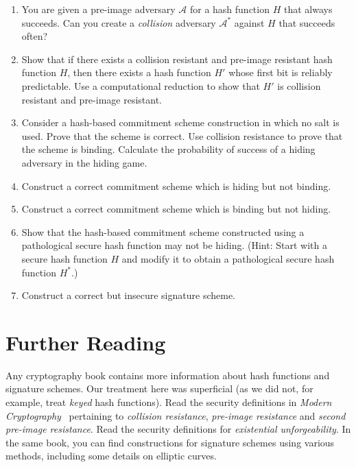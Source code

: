 \begin{enumerate}
  \item You are given a pre-image adversary $\mathcal{A}$ for a hash function $H$ that always
        succeeds. Can you create a \emph{collision} adversary $\mathcal{A}^*$ against $H$
        that succeeds often?
  \item Show that if there exists a collision resistant and pre-image resistant hash function $H$,
        then there exists a hash function $H'$ whose first bit is reliably predictable.
        Use a computational reduction to show that $H'$ is collision resistant and pre-image
        resistant.
  \item Consider a hash-based commitment scheme construction in which no salt is used.
        Prove that the scheme is correct. Use collision resistance to prove that the scheme is binding.
        Calculate the probability of success of a hiding adversary in the
        hiding game.\label{prob.commit-salt}
  \item Construct a correct commitment scheme which is hiding but not binding.
  \item Construct a correct commitment scheme which is binding but not hiding.
  \item Show that the hash-based commitment scheme constructed using a
        pathological secure hash function may not be hiding.
        (Hint: Start with a secure hash function $H$ and modify it
         to obtain a pathological secure hash function $H^*$.)\label{prob.preimage-no-hide}
  \item Construct a correct but insecure signature scheme.
\end{enumerate}

\section*{Further Reading}

Any cryptography book contains more information about hash functions and signature schemes.
Our treatment here was superficial (as we did not, for example, treat \emph{keyed} hash functions).
Read the security definitions in \emph{Modern Cryptography}~\cite{katz} pertaining to \emph{collision resistance},
\emph{pre-image resistance} and \emph{second pre-image resistance}. Read the security definitions
for \emph{existential unforgeability}. In the same book, you can find constructions for signature
schemes using various methods, including some details on elliptic curves.

